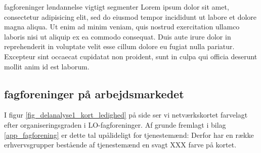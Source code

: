 fagforeninger løndannelse vigtigt  segmenter Lorem ipsum dolor sit amet, consectetur adipisicing elit, sed do eiusmod
tempor incididunt ut labore et dolore magna aliqua. Ut enim ad minim veniam,
quis nostrud exercitation ullamco laboris nisi ut aliquip ex ea commodo
consequat. Duis aute irure dolor in reprehenderit in voluptate velit esse
cillum dolore eu fugiat nulla pariatur. Excepteur sint occaecat cupidatat non
proident, sunt in culpa qui officia deserunt mollit anim id est laborum.


%
\subsection{fagforeninger på arbejdsmarkedet }
%

I figur \ref{fig_delanalyse1_kort_ledighed} på side \pageref{fig_delanalyse1_kort_ledighed} ser vi netværkskortet farvelagt efter organiseringsgraden i LO-fagforeninger. Af grunde fremlagt i bilag \ref{app_fagforening} er dette tal upålideligt for tjenestemænd: Derfor har en række erhvervsgrupper bestående af tjenestemænd en svagt XXX farve på kortet.  






